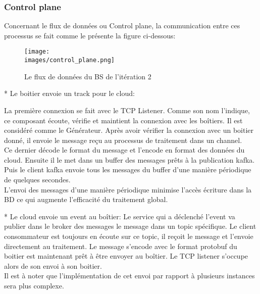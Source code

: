            \subsubsection{Control plane}
             Concernant le flux de données ou Control plane, la communication entre 
             ces processus se fait comme le présente la figure ci-dessous: \\

             \begin{figure}[ht]
                \centering
                \texttt{[image: \\images/control\_plane.png]}
                \caption{Le flux de données du BS de l'itération 2}
                \label{Figure }
            \end{figure}


            * Le boitier envoie un track pour le cloud: 


            La première connexion se fait avec le TCP Listener. 
            Comme son nom l’indique, ce composant écoute, vérifie et  maintient la 
            connexion avec les boîtiers. Il est considéré comme le Générateur. 
            Après avoir vérifier la connexion avec un boitier donné, il envoie le 
            message reçu au processus de traitement dans un channel. \\
            Ce dernier décode le format du message et l’encode en format des données du 
            cloud. Ensuite il le met dans un buffer des messages prêts à la publication 
            kafka. Puis le client kafka envoie tous les messages du buffer d’une manière 
            périodique de quelques secondes.\\ 
            L’envoi des messages d’une manière périodique minimise l'accès 
            écriture dans la BD ce qui augmente l’efficacité du traitement global. 

            *  Le cloud envoie un event au boîtier: 
            Le service qui a déclenché l’event va publier dans le broker des messages le 
            message dans un topic spécifique. Le client consommateur est toujours en écoute sur ce topic, 
            il reçoit le message et l'envoie directement au traitement. Le message s’encode avec le format 
            protobuf du boitier est maintenant prêt à être envoyer au boîtier. Le TCP listener s’occupe alors 
            de son envoi à son boitier. \\
            Il est à noter que l'implémentation de cet envoi par rapport à plusieurs 
            instances sera plus complexe. 


